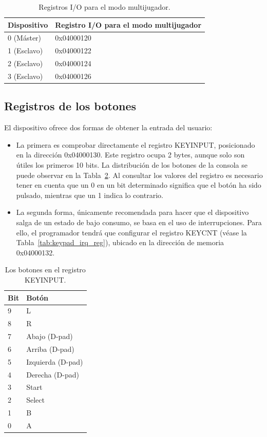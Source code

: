 {\begin{table}[h]
	\centering
	\begin{tabular}{| l | l |}
		\hline
		\textbf{Dispositivo} & \textbf{Registro I/O para el modo multijugador} \\ \hline
		0 (Máster) &  0x04000120 \\ \hline
		1 (Esclavo) &  0x04000122 \\ \hline
		2 (Esclavo) &  0x04000124 \\ \hline
		3 (Esclavo) &  0x04000126 \\ \hline
	\end{tabular}
	\caption{Registros I/O para el modo multijugador.}\label{tab:mult_modo}
\end{table}
\FloatBarrier{}

\subsection{Registros de los botones}
El dispositivo ofrece dos formas de obtener la entrada del usuario:

\begin{itemize}
	\item La primera es comprobar directamente el registro KEYINPUT, posicionado en la dirección 0x04000130. Este registro ocupa 2 bytes, aunque solo son útiles los primeros 10 bits. La distribución de los botones de la consola se puede observar en la Tabla~\ref{tab:keypad_reg}. Al consultar los valores del registro es necesario tener en cuenta que un 0 en un bit determinado significa que el botón ha sido pulsado, mientras que un 1 indica lo contrario.
	\item La segunda forma, únicamente recomendada para hacer que el dispositivo salga de un estado de bajo consumo, se basa en el uso de interrupciones. Para ello, el programador tendrá que configurar el registro KEYCNT (véase la Tabla~\ref{tab:keypad_irq_reg}), ubicado en la dirección de memoria 0x04000132.
\end{itemize}

	\begin{table}[h]
		\centering
		\begin{tabular}{| l | l |}
			\hline
			\textbf{Bit} & \textbf{Botón} \\ \hline
			9 &  L \\ \hline
			8 &  R \\ \hline
			7 &  Abajo (D-pad) \\ \hline
			6 &  Arriba (D-pad) \\ \hline
			5 &  Izquierda (D-pad) \\ \hline
			4 &  Derecha (D-pad) \\ \hline
			3 &  Start \\ \hline
			2 &  Select \\ \hline
			1 &  B \\ \hline
			0 &  A \\ \hline
		\end{tabular}
		\caption{Los botones en el registro KEYINPUT.}\label{tab:keypad_reg}
	\end{table}

}
